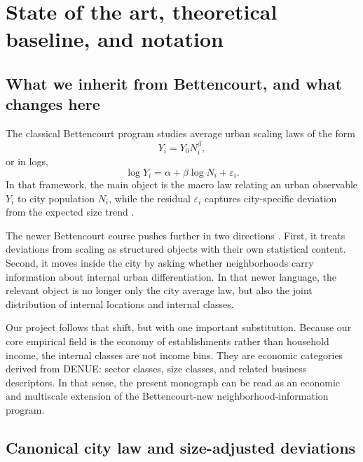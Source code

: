 \documentclass[11pt]{article}
\begin{document}
\section{State of the art, theoretical baseline, and notation}

\subsection{What we inherit from Bettencourt, and what changes here}

The classical Bettencourt program studies average urban scaling laws of the form
\begin{equation}
Y_i = Y_0 N_i^\beta,
\end{equation}
or in logs,
\begin{equation}
\log Y_i = \alpha + \beta \log N_i + \varepsilon_i.
\end{equation}
In that framework, the main object is the macro law relating an urban observable \(Y_i\) to city population \(N_i\), while the residual \(\varepsilon_i\) captures city-specific deviation from the expected size trend \citep{bettencourt2007growth,bettencourt2010urban,bettencourt2013origins}.

The newer Bettencourt course pushes further in two directions \citep{bettencourt2024lecture10,bettencourt2024lecture11,bettencourt2024lecture12,bettencourt2024lecture18}. First, it treats deviations from scaling as structured objects with their own statistical content. Second, it moves inside the city by asking whether neighborhoods carry information about internal urban differentiation. In that newer language, the relevant object is no longer only the city average law, but also the joint distribution of internal locations and internal classes.

Our project follows that shift, but with one important substitution. Because our core empirical field is the economy of establishments rather than household income, the internal classes are not income bins. They are economic categories derived from DENUE: sector classes, size classes, and related business descriptors. In that sense, the present monograph can be read as an economic and multiscale extension of the Bettencourt-new neighborhood-information program.

\subsection{Canonical city law and size-adjusted deviations}
\end{document}

